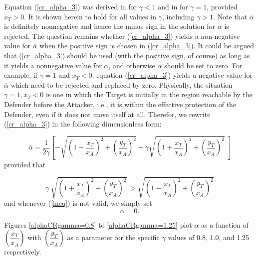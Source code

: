 Equation (\ref{cr_alpha_3}) was derived in \cite{garcia2015escape} for $\gamma<1$ and in \cite{pachter2014active} for $\gamma=1$, provided $x_{T}>0$. It is shown herein to hold for all values in $\gamma$, including $\gamma>1$. Note that $\overline{\alpha}$ is definitely nonnegative and hence the minus sign in the solution for $\overline{\alpha}$ is rejected. The question remains whether (\ref{cr_alpha_3}) yields a non-negative value for $\overline{\alpha}$ when the positive sign is chosen in (\ref{cr_alpha_3}). It could be argued that (\ref{cr_alpha_3}) should be used (with the positive sign, of course) as long as it yields a nonnegative value for  $\overline{\alpha}$, and otherwise  $\overline{\alpha}$ should be set to zero. For example, if $\gamma=1$ and $x_T<0$, equation (\ref{cr_alpha_3}) yields a negative value for $\overline{\alpha}$ which need to be rejected and replaced by zero. Physically, the situation ${\gamma=1, x_T<0}$ is one in which the Target is initially in the region reachable by the Defender before the Attacker, i.e., it is within the effective protection of the Defender, even if it does not move itself at all. Therefor, we rewrite (\ref{cr_alpha_3}) in the following dimensionless form:

\begin{equation}
\overline{\alpha} = \dfrac{1}{2 \gamma} [-\sqrt{(1-\dfrac{x_T}{x_A})^2 + (\dfrac{y_T}{x_A})^2}+ \gamma \sqrt{(1+\dfrac{x_T}{x_A})^2 + (\dfrac{y_T}{x_A})^2}\ ]
\label{dimensionless-alphaCR}
\end{equation} 
provided that 

\begin{equation}
\gamma\ \sqrt{(1+\dfrac{x_T}{x_A})^2 + (\dfrac{y_T}{x_A})^2}\ > \sqrt{(1-\dfrac{x_T}{x_A})^2 + (\dfrac{y_T}{x_A})^2}
\label{ineq}
\end{equation}
and whenever (\ref{ineq}) is not valid, we simply set
\begin{equation}
\overline{\alpha}=0.
\end{equation}


Figures \ref{alphaCRgamma=0.8} to \ref{alphaCRgamma=1.25} plot $\alpha$ as a function of $(\dfrac{x_T}{x_A})$ with $(\dfrac{y_T}{x_A})$ as a parameter for the specific $\gamma$ values of 0.8, 1.0, and 1.25 respectively.

